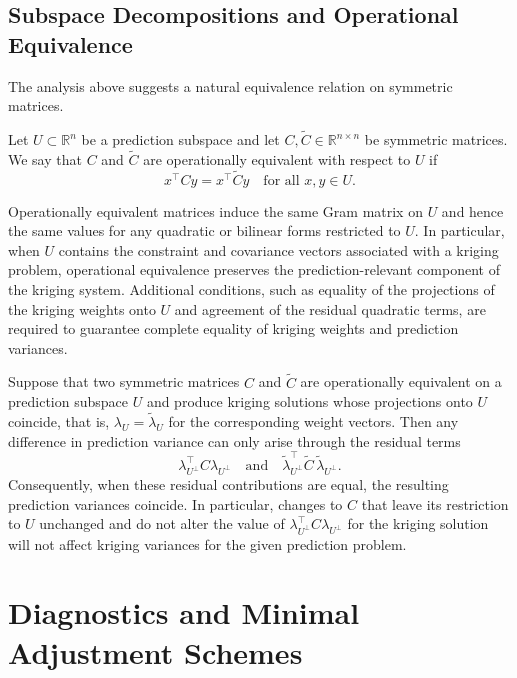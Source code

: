 \documentclass[smallextended]{svjour3}
\newcommand{\R}{\mathbb{R}}
\newcommand{\T}{\top}
\newcommand{\1}{\mathbf{1}}
\let\oldremark\remark
\let\endoldremark\endremark
\renewenvironment{remark}{\oldremark\upshape}{\endoldremark}
\begin{document}
\subsection{Subspace Decompositions and Operational Equivalence}

The analysis above suggests a natural equivalence relation on symmetric matrices.

\begin{definition}
	Let $U \subset \R^n$ be a prediction subspace and let $C,\tilde{C} \in \R^{n \times n}$ be symmetric matrices.
	We say that $C$ and $\tilde{C}$ are operationally equivalent with respect to $U$ if
	\[
	x^{\T} C y = x^{\T} \tilde{C} y
	\quad
	\text{for all } x,y \in U.
	\]
\end{definition}

Operationally equivalent matrices induce the same Gram matrix on $U$ and hence the same values for any quadratic or bilinear forms restricted to $U$. In particular, when $U$ contains the constraint and covariance vectors associated with a kriging problem, operational equivalence preserves the prediction-relevant component of the kriging system. Additional conditions, such as equality of the projections of the kriging weights onto $U$ and agreement of the residual quadratic terms, are required to guarantee complete equality of kriging weights and prediction variances.

\begin{remark}
	Suppose that two symmetric matrices $C$ and $\tilde C$ are operationally equivalent on a prediction subspace $U$ and produce kriging solutions whose projections onto $U$ coincide, that is, $\lambda_U = \tilde\lambda_U$ for the corresponding weight vectors. Then any difference in prediction variance can only arise through the residual terms
	\[
	\lambda_{U^\perp}^{\top} C \lambda_{U^\perp}
	\quad\text{and}\quad
	\tilde\lambda_{U^\perp}^{\top} \tilde C\, \tilde\lambda_{U^\perp}.
	\]
	Consequently, when these residual contributions are equal, the resulting prediction variances coincide. In particular, changes to $C$ that leave its restriction to $U$ unchanged and do not alter the value of $\lambda_{U^\perp}^{\top} C \lambda_{U^\perp}$ for the kriging solution will not affect kriging variances for the given prediction problem.
\end{remark}
	
\section{Diagnostics and Minimal Adjustment Schemes}
\label{sec:diagnostics}
\end{document}
